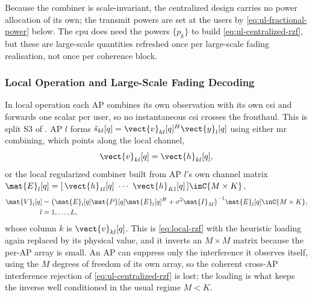 Because the combiner is scale-invariant, the centralized design carries no power
allocation of its own; the transmit powers are set at the users by
\eqref{eq:ul-fractional-power} below. The \gls{cpu} does need the powers
$\{p_{k}\}$ to build \eqref{eq:ul-centralized-rzf}, but these are large-scale
quantities refreshed once per large-scale fading realisation, not once per
coherence block.


\subsubsection{Local Operation and Large-Scale Fading Decoding}
\label{sssec:ul_local}

In local operation each AP combines its own observation with its own \gls{csi}
and forwards one scalar per user, so no instantaneous \gls{csi} crosses the
fronthaul. This is split S3 of . AP $l$ forms
$\hat{s}_{kl}[q]=\vect{v}_{kl}[q]^{H}\vect{y}_{l}[q]$ using either \gls{mr}
combining, which points along the local channel,
\begin{equation}
\label{eq:ul-mr-combiner}
\vect{v}_{kl}[q] = \vect{h}_{kl}[q],
\end{equation}
or the local regularized combiner built from AP $l$'s own channel matrix
$\mat{E}_{l}[q]=[\,\vect{h}_{1l}[q]\ \cdots\ \vect{h}_{Kl}[q]\,]\inC{M\times K}$,
\begin{align}
\label{eq:ul-local-rzf}
\mat{V}_{l}[q] &= \big(\mat{E}_{l}[q]\mat{P}[q]\mat{E}_{l}[q]^{H}
+\sigma^{2}\mat{I}_{M}\big)^{-1}\mat{E}_{l}[q] \inC{M\times K},\\
 l&=1,\dots,L,
\end{align}
whose column $k$ is $\vect{v}_{kl}[q]$. This is \eqref{eq:local-rzf} with the
heuristic loading again replaced by its physical value, and it inverts an
$M\times M$ matrix because the per-AP array is small. An AP can suppress only the
interference it observes itself, using the $M$ degrees of freedom of its own
array, so the coherent cross-AP interference rejection of
\eqref{eq:ul-centralized-rzf} is lost; the loading is what keeps the inverse well
conditioned in the usual regime $M<K$.

